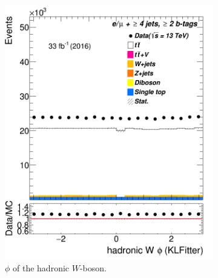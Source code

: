 \begin{figure}
\begin{subfigure}{0.35\textwidth}
		\includegraphics[width=\linewidth]{ControlPlots_emujets_2016_4incl_2incl/klf_Whad_phi_emujets_2016.png}
		\caption{$\phi$ of the hadronic $W$-boson.} \label{fig:36}
	\end{subfigure}
	\medskip
	\begin{subfigure}{0.35\textwidth}

\end{subfigure}
\end{figure}
